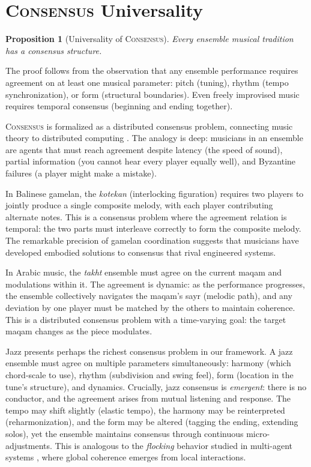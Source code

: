 \documentclass[cmj]{article}
\newtheorem{proposition}{Proposition}
\newcommand{\CONSENSUS}{\textsc{Consensus}}
\begin{document}
\section{\CONSENSUS{} Universality}
\label{sec:consensus-sec}

\begin{proposition}[Universality of \CONSENSUS{}]
Every ensemble musical tradition has a consensus structure.
\end{proposition}

The proof follows from the observation that any ensemble performance requires
agreement on at least one musical parameter: pitch (tuning), rhythm (tempo
synchronization), or form (structural boundaries). Even freely improvised
music requires temporal consensus (beginning and ending together).

\CONSENSUS{} is formalized as a distributed consensus problem, connecting
music theory to distributed computing \citep{lamport1982consensus}. The
analogy is deep: musicians in an ensemble are agents that must reach agreement
despite latency (the speed of sound), partial information (you cannot hear
every player equally well), and Byzantine failures (a player might make a
mistake).

In Balinese gamelan, the \emph{kotekan} (interlocking figuration) requires two
players to jointly produce a single composite melody, with each player
contributing alternate notes. This is a consensus problem where the agreement
relation is temporal: the two parts must interleave correctly to form the
composite melody. The remarkable precision of gamelan coordination
\citep{tenzer2000gamelan} suggests that musicians have developed embodied
solutions to consensus that rival engineered systems.

In Arabic music, the \emph{takht} ensemble must agree on the current maqam
and modulations within it. The agreement is dynamic: as the performance
progresses, the ensemble collectively navigates the maqam's sayr (melodic
path), and any deviation by one player must be matched by the others to
maintain coherence. This is a distributed consensus problem with a time-varying
goal: the target maqam changes as the piece modulates.

Jazz presents perhaps the richest consensus problem in our framework. A jazz
ensemble must agree on multiple parameters simultaneously: harmony (which
chord-scale to use), rhythm (subdivision and swing feel), form (location in
the tune's structure), and dynamics. Crucially, jazz consensus is
\emph{emergent}: there is no conductor, and the agreement arises from mutual
listening and response. The tempo may shift slightly (elastic tempo), the
harmony may be reinterpreted (reharmonization), and the form may be altered
(tagging the ending, extending solos), yet the ensemble maintains consensus
through continuous micro-adjustments. This is analogous to the \emph{flocking}
behavior studied in multi-agent systems \citep{olfati2004consensus}, where
global coherence emerges from local interactions.
\end{document}
